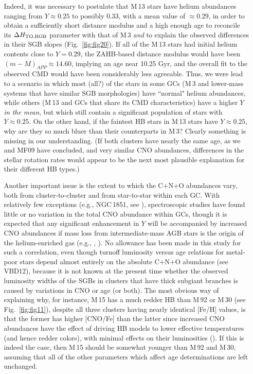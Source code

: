 \documentclass[12pt,preprint]{aastex}
\newcommand\delc{\Delta H_{\rm TO,RGB}}
\begin{document}
Indeed, it was necessary to postulate that M$\,$13 stars have helium abundances
ranging from $Y \approx 0.25$ to possibly 0.33, with a mean value of $\approx
0.29$, in order to obtain a sufficiently short distance modulus and a high
enough age to reconcile its $\delc$ parameter with that of M$\,$3 {\it and} to
explain the observed differences in their SGB slopes (Fig.~\ref{fig:fig20}).  If
all of the M$\,$13 stars had initial helium contents close to $Y = 0.29$, the
ZAHB-based distance modulus would have been $(m-M)_{APP} \approx 14.60$,
implying an age near 10.25 Gyr, and the overall fit to the observed CMD would
have been considerably less agreeable.  Thus, we were lead to a scenario in
which most (all?) of the stars in some GCs (M$\,$3 and lower-mass systems that
have similar SGB morphologies) have ``normal" helium abundances, while others
(M$\,$13 and GCs that share its CMD characteristics)  have a higher $Y$ {\it in
the mean}, but which still contain a significant population of stars with $Y
\approx 0.25$.   On the other hand, if the faintest HB stars in M$\,$13 stars
have $Y \approx 0.25$, why are they so much bluer than their counterparts in
M$\,$3?  Clearly something is missing in our understanding.  (If both clusters
have nearly the same age, as we and MF09 have concluded, and very similar CNO
abundances, differences in the stellar rotation rates would appear to be the
next most plausible explanation for their different HB types.) 

Another important issue is the extent to which the C$+$N$+$O abundances vary,
both from cluster-to-cluster and from star-to-star within each GC.  With
relatively few exceptions (e.g., NGC$\,$1851, see \citealt{ygd09}), 
spectroscopic studies have found little or no variation in the total CNO
abundance within GCs, though it is expected that any
significant enhancement in $Y$ will be accompanied by increased CNO abundances
if mass loss from intermediate-mass AGB stars is the origin of the
helium-enriched gas (e.g., \citealt{fck04}, \citealt{kfs06}).  No allowance has
been made in this study for such a correlation, even though turnoff luminosity
versus age relations for metal-poor stars depend almost entirely on the absolute
C$+$N$+$O abundance (see VBD12), because it is not known at the present time
whether the observed luminosity widths of the SGBs in clusters that have thick
subgiant branches is caused by variations in CNO or age (or both).   The most
obvious way of explaining why, for instance, M$\,$15 has a much redder HB than
M$\,$92 or M$\,$30 (see Fig.~\ref{fig:fig11}), despite all three clusters having
nearly identical [Fe/H] values, is that the former has higher [CNO/Fe] than the
latter since increased CNO abundances have the effect of driving HB models to
lower effective temperatures (and hence redder colors), with minimal effects on
their luminosities (\citealt{ct77}).   If this is indeed the case, then M$\,$15
should be somewhat younger than M$\,$92 and M$\,$30, assuming that all of the
other parameters which affect age determinations are left unchanged.
\end{document}
